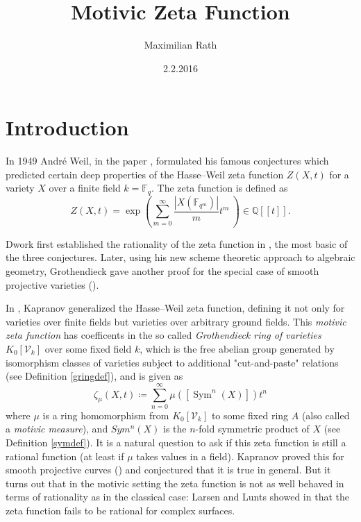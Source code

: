 \documentclass[11pt, a4paper, german]{article}
\author{Maximilian Rath}
\date{2.2.2016}
\title{Motivic Zeta Function}
\theoremstyle{plain}
\newtheorem{theorem}{Theorem}[section]
\theoremstyle{definition}
\newcommand{\gring}[1][k]{K_0[\mathcal{V}_#1]}
\DeclareMathOperator{\Sym}{Sym}
\begin{document}
\maketitle
\tableofcontents
\section{Introduction}

In 1949 Andr\'e Weil, in the paper \cite{weil1949}, formulated his famous conjectures
which predicted certain deep properties of the Hasse--Weil zeta function $Z(X,t)$ for a variety $X$ over a finite field $k = \mathbb{F}_q$.
The zeta function is defined as 
\[
    Z(X,t) = \exp \left(\sum_{m=0}^\infty \frac{|X(\mathbb{F}_{q^m})|}{m} t^m \ \right) \in \mathbb{Q}[[t]].
\]

Dwork first established the rationality of the zeta function in \cite{Dwork}, the most basic of the three conjectures. 
Later, using his new scheme theoretic approach to algebraic geometry, Grothendieck gave another proof for the special case of 
smooth projective varieties (\cite{GroRat}).


In \cite{kapranov}, Kapranov generalized the Hasse--Weil zeta function, defining it not only for varieties over finite fields
but varieties over arbitrary ground fields. 
This \emph{motivic zeta function} has coefficents in the so called \emph{Grothendieck ring of varieties} $\gring[k]$ 
over some fixed field $k$, 
which is the free abelian group generated by isomorphism classes of varieties subject to additional "cut-and-paste" relations
(see Definition \ref{gringdef}), and is given as 
\[
    \zeta_{\mu}(X,t) \coloneqq \sum_{n=0}^{\infty} \mu \left( \left[ \Sym^n(X) \right] \right) t^n
\]
where $\mu$ is a ring homomorphism from $\gring[k]$ to some fixed ring $A$ (also called a \emph{motivic measure}), 
and $Sym^n(X)$ is the $n$-fold symmetric product of $X$ (see Definition \ref{symdef}). 
It is a natural question to ask if this zeta function is still a rational function (at least if $\mu$ takes values in a field).
Kapranov proved this for smooth projective curves (\cite[Thm 1.1.9]{kapranov}) and conjectured that it is true in general.
But it turns out that in the motivic setting the zeta function is not as well behaved in terms of rationality as in the classical case:
Larsen and Lunts showed in \cite{MR1996804} that the zeta function fails to be rational for complex surfaces.
\end{document}
